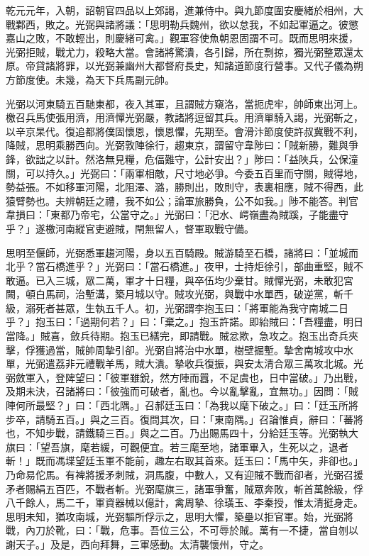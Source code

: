 \begin{pinyinscope}
 乾元元年，入朝，詔朝官四品以上郊謁，進兼侍中。與九節度圍安慶緒於相州，大戰鄴西，敗之。光弼與諸將議：「思明勒兵魏州，欲以怠我，不如起軍逼之。彼懲嘉山之敗，不敢輕出，則慶緒可禽。」觀軍容使魚朝恩固謂不可。既而思明來援，光弼拒賊，戰尤力，殺略大當。會諸將驚潰，各引歸，所在剽掠，獨光弼整眾還太原。帝貸諸將罪，以光弼兼幽州大都督府長史，知諸道節度行營事。又代子儀為朔方節度使。未幾，為天下兵馬副元帥。



 光弼以河東騎五百馳東都，夜入其軍，且謂賊方窺洛，當扼虎牢，帥師東出河上。檄召兵馬使張用濟，用濟憚光弼嚴，教諸將逗留其兵。用濟單騎入謁，光弼斬之，以辛京杲代。復追都將僕固懷恩，懷恩懼，先期至。會滑汴節度使許叔冀戰不利，降賊，思明乘勝西向。光弼敦陣徐行，趨東京，謂留守韋陟曰：「賊新勝，難與爭鋒，欲詘之以計。然洛無見糧，危偪難守，公計安出？」陟曰：「益陜兵，公保潼關，可以持久。」光弼曰：「兩軍相敵，尺寸地必爭。今委五百里而守關，賊得地，勢益張。不如移軍河陽，北阻澤、潞，勝則出，敗則守，表裏相應，賊不得西，此猿臂勢也。夫辨朝廷之禮，我不如公；論軍旅勝負，公不如我。」陟不能答。判官韋損曰：「東都乃帝宅，公當守之。」光弼曰：「汜水、崿嶺盡為賊蹊，子能盡守乎？」遂檄河南縱官吏避賊，閈無留人，督軍取戰守備。



 思明至偃師，光弼悉軍趨河陽，身以五百騎殿。賊游騎至石橋，諸將曰：「並城而北乎？當石橋進乎？」光弼曰：「當石橋進。」夜甲，士持炬徐引，部曲重堅，賊不敢逼。已入三城，眾二萬，軍才十日糧，與卒伍均少棄甘。賊憚光弼，未敢犯宮闕，頓白馬祠，治塹溝，築月城以守。賊攻光弼，與戰中水單西，破逆黨，斬千級，溺死者甚眾，生執五千人。初，光弼謂李抱玉曰：「將軍能為我守南城二日乎？」抱玉曰：「過期何若？」曰：「棄之。」抱玉許諾。即紿賊曰：「吾糧盡，明日當降。」賊喜，斂兵待期。抱玉已繕完，即請戰。賊忿欺，急攻之。抱玉出奇兵夾擊，俘獲過當，賊帥周摯引卻。光弼自將治中水單，樹壁掘塹。摯舍南城攻中水單，光弼遣荔非元禮戰羊馬，賊大潰。摯收兵復振，與安太清合眾三萬攻北城。光弼斂軍入，登陴望曰：「彼軍雖銳，然方陣而囂，不足虞也，日中當破。」乃出戰，及期未決，召諸將曰：「彼強而可破者，亂也。今以亂擊亂，宜無功。」因問：「賊陣何所最堅？」曰：「西北隅。」召郝廷玉曰：「為我以麾下破之。」曰：「廷玉所將步卒，請騎五百。」與之三百。復問其次，曰：「東南隅。」召論惟貞，辭曰：「蕃將也，不知步戰，請鐵騎三百。」與之二百。乃出賜馬四十，分給廷玉等。光弼執大旗曰：「望吾旗，麾若緩，可觀便宜。若三麾至地，諸軍畢入，生死以之，退者斬！」既而馮堞望廷玉軍不能前，趣左右取其首來。廷玉曰：「馬中矢，非卻也。」乃命易佗馬。有裨將援矛刺賊，洞馬腹，中數人，又有迎賊不戰而卻者，光弼召援矛者賜絹五百匹，不戰者斬。光弼麾旗三，諸軍爭奮，賊眾奔敗，斬首萬餘級，俘八千餘人，馬二千，軍資器械以億計，禽周摯、徐璜玉、李秦授，惟太清挺身走。思明未知，猶攻南城，光弼驅所俘示之，思明大懼，築壘以拒官軍。始，光弼將戰，內刀於靴，曰：「戰，危事。吾位三公，不可辱於賊。萬有一不捷，當自刎以謝天子。」及是，西向拜舞，三軍感動。太清襲懷州，守之。




\end{pinyinscope}

